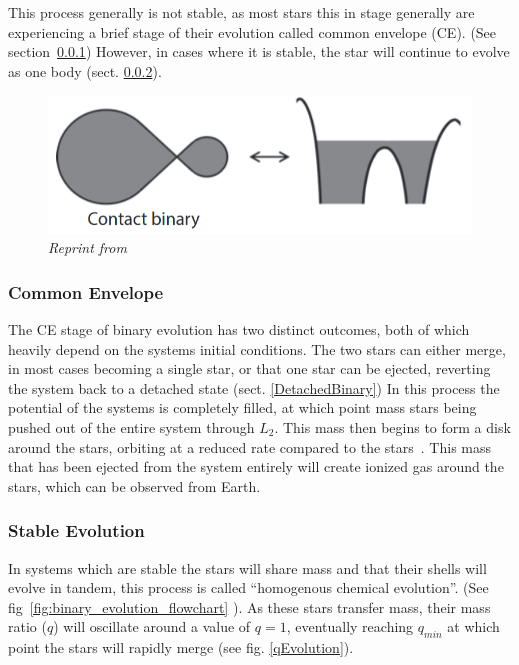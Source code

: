\documentclass[12pt, a4paper]{article}
\begin{document}
        This process generally is not stable, as most stars this in stage generally are experiencing a brief stage of their evolution called common envelope (CE). (See section~\ref{CommonEnvelope}) However, in cases where it is stable, the star will continue to evolve as one body (sect. \ref{CommonEnvelopeStableEvoluton}).

        
        \begin{figure}
            \centering
            \includegraphics[scale = .4]{Figs/Conact Binary.png}

            \caption{\textit{Reprint from~\parencite{TaurisvandenHeuvel+2023}}}
            \label{ContactBinaryRL}
        \end{figure}
        
        \subsubsection{Common Envelope}\label{CommonEnvelope}
            The CE stage of binary evolution has two distinct outcomes, both of which heavily depend on the systems initial conditions. The two stars can either merge, in most cases becoming a single star, or that one star can be ejected, reverting the system back to a detached state (sect. \ref{DetachedBinary}) In this process the potential of the systems is completely filled, at which point mass stars being pushed out of the entire system through $L_2$. This mass then begins to form a disk around the stars, orbiting at a reduced rate compared to the stars~\parencite{TaurisvandenHeuvel+2023}. This mass that has been ejected from the system entirely will create ionized gas around the stars, which can be observed from Earth.~\parencite{TaurisvandenHeuvel+2023}

        \subsubsection{Stable Evolution}\label{CommonEnvelopeStableEvoluton}
            In systems which are stable the stars will share mass and that their shells will evolve in tandem, this process is called ``homogenous chemical evolution''. (See fig~\ref{fig:binary_evolution_flowchart} \parencite{Chen_2024}). As these stars transfer mass, their mass ratio ($q$) will oscillate around a value of $q=1$, eventually reaching $q_{min}$ at which point the stars will rapidly merge (see fig. \ref{qEvolution}). \parencite{Pešta_2023}
            
\end{document}
